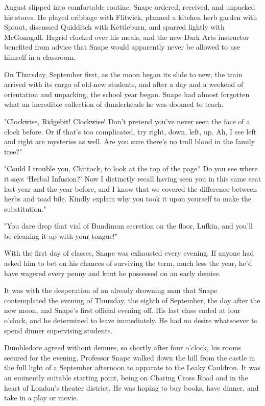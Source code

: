 August slipped into comfortable routine. Snape ordered, received, and unpacked his stores. He played cribbage with Flitwick, planned a kitchen herb garden with Sprout, discussed Quidditch with Kettleburn, and sparred lightly with McGonagall. Hagrid clucked over his meals, and the new Dark Arts instructor benefited from advice that Snape would apparently never be allowed to use himself in a classroom.

On Thursday, September first, as the moon began its slide to new, the train arrived with its cargo of old-new students, and after a day and a weekend of orientation and unpacking, the school year began. Snape had almost forgotten what an incredible collection of dunderheads he was doomed to teach.

"Clockwise, Ridgebit! Clockwise! Don't pretend you've never seen the face of a clock before. Or if that's too complicated, try right, down, left, up. Ah, I see left and right are mysteries as well. Are you sure there's no troll blood in the family tree?"

"Could I trouble you, Chittock, to look at the top of the page? Do you see where it says `Herbal Infusion?' Now I distinctly recall having seen you in this same seat last year and the year before, and I know that we covered the difference between herbs and toad bile. Kindly explain why you took it upon yourself to make the substitution."

"You dare drop that vial of Bundimun secretion on the floor, Lufkin, and you'll be cleaning it up with your tongue!"

With the first day of classes, Snape was exhausted every evening. If anyone had asked him to bet on his chances of surviving the term, much less the year, he'd have wagered every penny and knut he possessed on an early demise.

It was with the desperation of an already drowning man that Snape contemplated the evening of Thursday, the eighth of September, the day after the new moon, and Snape's first official evening off. His last class ended at four o'clock, and he determined to leave immediately. He had no desire whatsoever to spend dinner supervising students.

Dumbledore agreed without demure, so shortly after four o'clock, his rooms secured for the evening, Professor Snape walked down the hill from the castle in the full light of a September afternoon to apparate to the Leaky Cauldron. It was an eminently suitable starting point, being on Charing Cross Road and in the heart of London's theater district. He was hoping to buy books, have dinner, and take in a play or movie.


